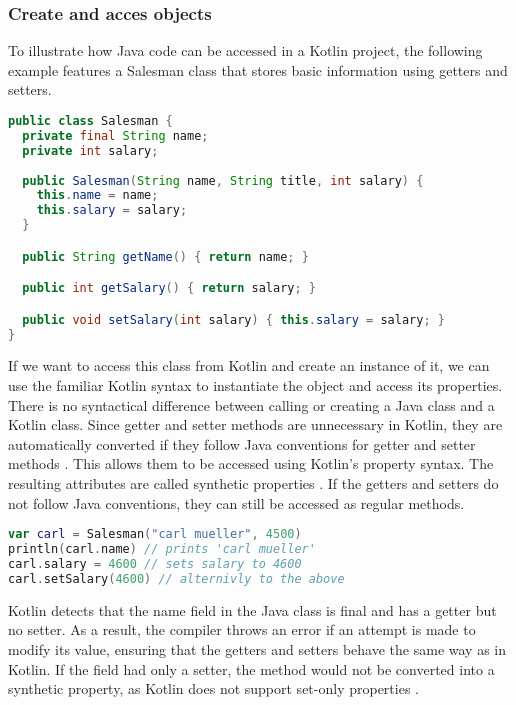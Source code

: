 \documentclass[a4paper,11pt]{article}
\begin{document}
\subsubsection{Create and acces objects}
To illustrate how Java code can be accessed in a Kotlin project, the following example features a Salesman class that stores basic information using getters and setters.
\begin{lstlisting}[language=Java,title={Example java class}]
public class Salesman {
  private final String name;
  private int salary;
  
  public Salesman(String name, String title, int salary) {
    this.name = name;
    this.salary = salary;
  }

  public String getName() { return name; }

  public int getSalary() { return salary; }

  public void setSalary(int salary) { this.salary = salary; }
}
\end{lstlisting}
If we want to access this class from Kotlin and create an instance of it, we can use the familiar Kotlin syntax \cite{interop} to instantiate the object and access its properties. There is no syntactical difference between calling or creating a Java class and a Kotlin class. Since getter and setter methods are unnecessary in Kotlin, they are automatically converted if they follow Java conventions for getter and setter methods \cite{interop-getter-setter}. This allows them to be accessed using Kotlin's property syntax. The resulting attributes are called synthetic properties \cite{interop-synthetic-property}. If the getters and setters do not follow Java conventions, they can still be accessed as regular methods.
\begin{lstlisting}[language=Kotlin, title={Access the Salesman class in Kotlin}]
var carl = Salesman("carl mueller", 4500)
println(carl.name) // prints 'carl mueller'
carl.salary = 4600 // sets salary to 4600
carl.setSalary(4600) // alternivly to the above
\end{lstlisting}
Kotlin detects that the name field in the Java class is final and has a getter but no setter. As a result, the compiler throws an error if an attempt is made to modify its value, ensuring that the getters and setters behave the same way as in Kotlin. If the field had only a setter, the method would not be converted into a synthetic property, as Kotlin does not support set-only properties \cite{interop-synthetic-property}. %
\end{document}
